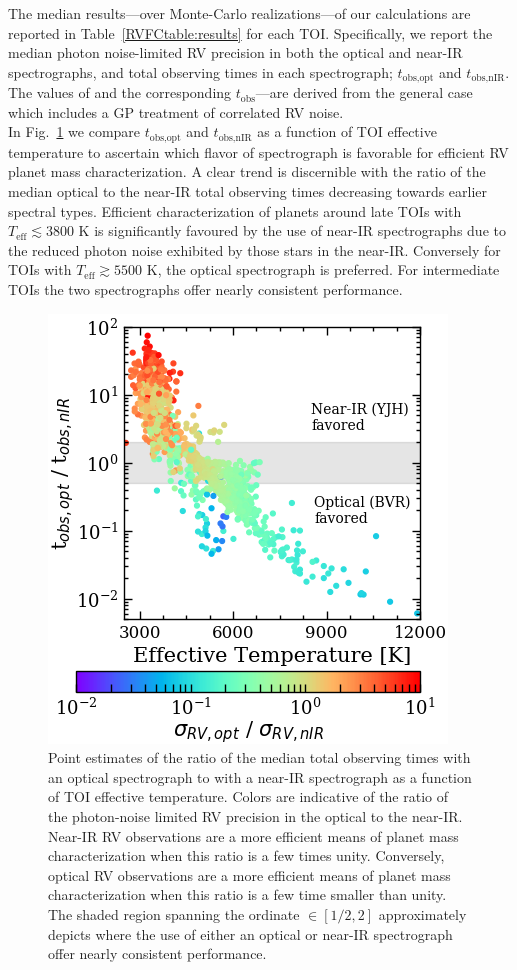 The median results---over Monte-Carlo realizations---of our calculations
are reported in Table~\ref{RVFCtable:results} for
each TOI. Specifically, we report the median photon noise-limited RV precision in both the optical and
near-IR spectrographs, \sigact{,} \sigplan{,} \nrv{,} and total observing times in each spectrograph;
$t_{\text{obs,opt}}$ and $t_{\text{obs,nIR}}$. The values of \nrv{---}and the corresponding
$t_{\text{obs}}$---are derived from the general case which includes a GP treatment of correlated RV noise. \\

In Fig.~\ref{RVFCfig:ratio} we compare $t_{\text{obs,opt}}$ and $t_{\text{obs,nIR}}$ as a function of
TOI effective temperature to ascertain which flavor of spectrograph is favorable for efficient RV planet
mass characterization. A clear trend is discernible with the ratio of the median optical
to the near-IR total observing times decreasing towards earlier spectral types.
Efficient characterization of planets around
late TOIs with $T_{\text{eff}} \lesssim 3800$ K is significantly favoured by the use of near-IR spectrographs
due to the reduced photon noise exhibited by those stars in the near-IR.
Conversely for TOIs with $T_{\text{eff}} \gtrsim 5500$ K, the optical spectrograph is preferred. For
intermediate TOIs the two spectrographs offer nearly consistent performance. \\

\begin{figure}
  \centering
  \includegraphics[width=0.6\hsize]{figures/optnIRratio.png}
  \caption[Comparing the optical and near-IR RV photon-noise limits for TOIs.]
      {\small Point estimates of
    the ratio of the median total observing times with an optical spectrograph to with a
    near-IR spectrograph as a function of TOI effective temperature. Colors are indicative of the
    ratio of the photon-noise limited RV precision in the optical to the near-IR. Near-IR RV observations
    are a more efficient means of planet mass characterization when this ratio is a few times unity.
    Conversely, optical RV observations are a more efficient means of planet mass characterization when
    this ratio is a few time smaller than unity. The shaded region spanning the ordinate $\in [1/2,2]$
    approximately depicts where the use of either an optical or near-IR spectrograph offer nearly
    consistent performance.}
  \label{RVFCfig:ratio}
\end{figure}

